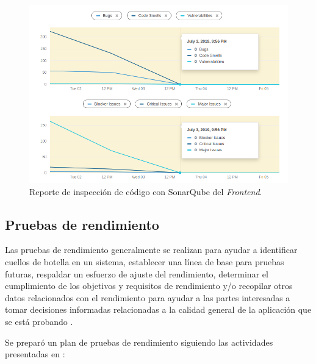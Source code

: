 \begin{figure}[H]
    \centering
    \includegraphics[width=\textwidth]{reporteQA_FE2.png}
    \caption{Reporte de inspección de código con SonarQube del \textit{Frontend}.}
    \label{fig:QAfrontend}
\end{figure}

\subsection{Pruebas de rendimiento}

Las pruebas de rendimiento generalmente se realizan para ayudar a identificar cuellos de botella en un sistema, establecer una línea de base para pruebas futuras, respaldar un esfuerzo de ajuste del rendimiento, determinar el cumplimiento de los objetivos y requisitos de rendimiento y/o recopilar otros datos relacionados con el rendimiento para ayudar a las partes interesadas a tomar decisiones informadas relacionadas a la calidad general de la aplicación que se está probando \citep{Corporation2007PerformanceApplications}.


Se preparó un plan de pruebas de rendimiento siguiendo las actividades presentadas en \citet{Corporation2007PerformanceApplications}:

